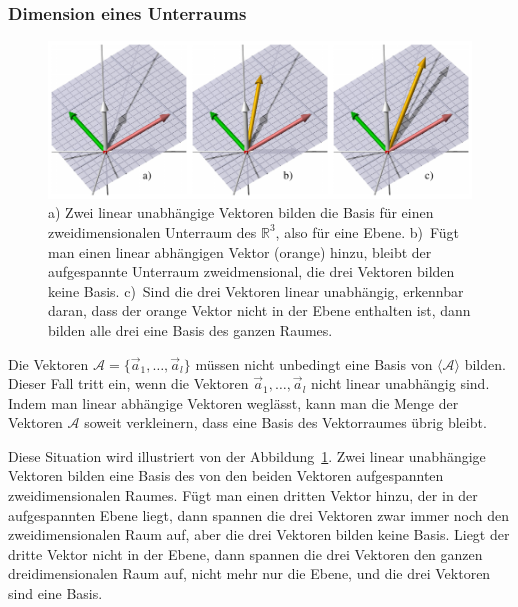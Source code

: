 \subsubsection{Dimension eines Unterraums}
\begin{figure}
\centering
\includegraphics[width=\hsize]{3/images/basis.pdf}
\caption{a) Zwei linear unabhängige Vektoren bilden die Basis für einen
zweidimensionalen Unterraum des $\mathbb R^3$, also für eine Ebene.
b)~Fügt man einen linear abhängigen Vektor (orange) hinzu, bleibt der
aufgespannte Unterraum zweidmensional, die drei Vektoren bilden keine
Basis. c)~Sind die drei Vektoren linear unabhängig, erkennbar daran, dass
der orange Vektor nicht in der Ebene enthalten ist, dann bilden alle
drei eine Basis des ganzen Raumes.
\label{skript:basisvektoren}}
\end{figure}
Die Vektoren $\mathcal{A}=\{\vec{a}_1,\dots,\vec{a}_l\}$ müssen nicht
unbedingt eine Basis von $\langle\mathcal{A}\rangle$ bilden.
Dieser Fall tritt ein, wenn die Vektoren $\vec{a}_1,\dots,\vec{a}_l$
nicht linear unabhängig sind.
Indem man linear abhängige Vektoren weglässt, kann man die Menge der
Vektoren $\mathcal{A}$ soweit verkleinern, dass eine Basis des 
Vektorraumes übrig bleibt.

Diese Situation wird illustriert von der Abbildung~\ref{skript:basisvektoren}.
Zwei linear unabhängige Vektoren bilden eine Basis des von den beiden
Vektoren aufgespannten zweidimensionalen Raumes.
Fügt man einen dritten Vektor hinzu, der in der aufgespannten Ebene liegt,
dann spannen die drei Vektoren zwar immer noch den zweidimensionalen
Raum auf, aber die drei Vektoren bilden keine Basis.
Liegt der dritte Vektor nicht in der Ebene, dann spannen die drei Vektoren
den ganzen dreidimensionalen Raum auf, nicht mehr nur die Ebene, und
die drei Vektoren sind eine Basis.


